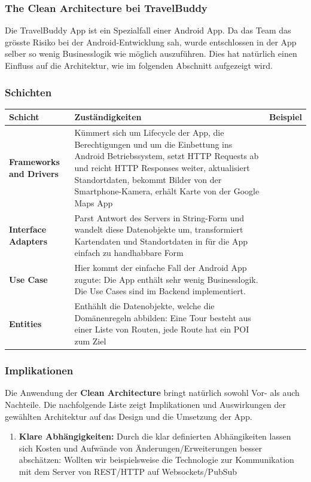 \documentclass[a4paper,10pt,xetex]{article}
\begin{document}
\subsubsection{The Clean Architecture bei TravelBuddy}
Die TravelBuddy App ist ein Spezialfall einer Android App. Da das Team das grösste 
Risiko bei der Android-Entwicklung sah, wurde entschlossen in der App selber so 
wenig Businesslogik wie möglich auszuführen. 
Dies hat natürlich einen Einfluss auf die Architektur, wie im folgenden Abschnitt aufgezeigt wird.


\subsubsection{Schichten}\label{layerstravelbuddy}
\begin{longtabu} to \textwidth { | l | X[l] |  }
\hline
\textbf{Schicht} & \textbf{Zuständigkeiten} & \textbf{Beispiel} \\\hline
\endhead
\textbf{Frameworks and Drivers} & Kümmert sich um Lifecycle der App, die Berechtigungen 
und um die Einbettung ins Android Betriebssystem, setzt HTTP Requests ab und reicht 
HTTP Responses weiter, aktualisiert Standortdaten, bekommt Bilder von der 
Smartphone-Kamera, erhält Karte von der Google Maps App\\\hline
\textbf{Interface Adapters} & Parst Antwort des Servers in String-Form und wandelt 
diese Datenobjekte um, transformiert Kartendaten und Standortdaten in für die App 
einfach zu handhabbare Form\\\hline
\textbf{Use Case} & Hier kommt der einfache Fall der Android App zugute: Die App 
enthält sehr wenig Businesslogik. Die Use Cases sind im Backend implementiert.\\\hline
\textbf{Entities} & Enthählt die Datenobjekte, welche die Domänenregeln abbilden: 
Eine Tour besteht aus einer Liste von Routen, jede Route hat ein POI zum Ziel\\\hline
\end{longtabu}

\subsubsection{Implikationen}\label{implications}
Die Anwendung der \textbf{Clean Architecture} bringt natürlich sowohl Vor- als auch Nachteile. 
Die nachfolgende Liste zeigt Implikationen und Auswirkungen der gewählten Architektur 
auf das Design und die Umsetzung der App. 
\begin{enumerate}
\item \textbf{Klare Abhängigkeiten:} Durch die klar definierten Abhängikeiten 
    lassen sich Kosten und Aufwände von Änderungen/Erweiterungen besser abschätzen: 
    Wollten wir beispielsweise die Technologie zur Kommunikation mit dem Server 
    von REST/HTTP auf Websockets/PubSub
\end{enumerate}
\end{document}
